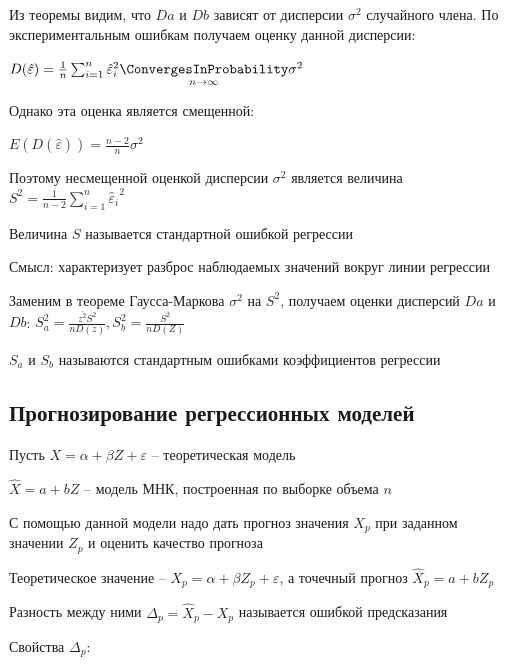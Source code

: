 Из теоремы видим, что $Da$ и $Db$ зависят от дисперсии $\sigma^2$ случайного члена. 
По экспериментальным ошибкам получаем оценку данной дисперсии:

$D(\hat \varepsilon) = \frac{1}{n} \sum_{i = 1}^n {\hat \varepsilon_i}^2 \underset{n \to \infty}{\ConvergesInProbability} \sigma^2$

Однако эта оценка является смещенной:

$E(D(\hat \varepsilon)) = \frac{n - 2}{n} \sigma^2$

Поэтому несмещенной оценкой дисперсии $\sigma^2$ является величина $S^2 = \frac{1}{n - 2} \sum_{i = 1}^n {\hat \varepsilon_i}^2$

\Def Величина $S$ называется стандартной ошибкой регрессии

Смысл: характеризует разброс наблюдаемых значений вокруг линии регрессии

\Nota Заменим в теореме Гаусса-Маркова $\sigma^2$ на $S^2$, получаем оценки дисперсий $Da$ и $Db$: $S_a^2 = \frac{\overline{z^2} S^2}{n D(z)}, S^2_b = \frac{S^2}{n D(Z)}$

\Def $S_a$ и $S_b$ называются стандартным ошибками коэффициентов регрессии

\subsection{Прогнозирование регрессионных моделей}

Пусть $X = \alpha + \beta Z + \varepsilon$ -- теоретическая модель

$\hat X = a + b Z$ -- модель МНК, построенная по выборке объема $n$

С помощью данной модели надо дать прогноз значения $X_p$ при заданном значении $Z_p$ и оценить качество прогноза 

Теоретическое значение -- $X_p = \alpha + \beta Z_p + \varepsilon$, а точечный прогноз $\hat X_p = a + b Z_p$

Разность между ними $\Delta_p = \hat X_p - X_p$ называется ошибкой предсказания

Свойства $\Delta_p$:


